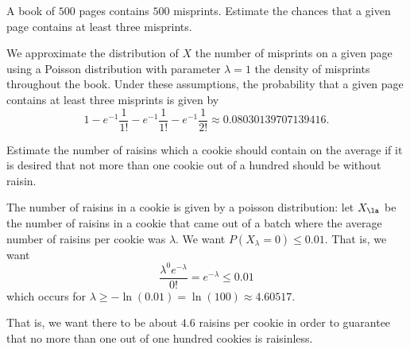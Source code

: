 \begin{problem}[Handout 10, \# 8]
  A book of \(500\) pages contains \(500\) misprints. Estimate the chances
  that a given page contains at least three misprints.
\end{problem}
\begin{solution}
  We approximate the distribution of \(X\) the number of misprints on a
  given page using a Poisson distribution with parameter \(\lambda=1\) the
  density of misprints throughout the book. Under these assumptions, the
  probability that a given page contains at least three misprints is given
  by
  \[
    1-e^{-1}\frac{1}{1!}-e^{-1}\frac{1}{1!}-e^{-1}\frac{1}{2!}
    \approx\num{0.08030139707139416}.
  \]
\end{solution}
\newpage

\begin{problem}[Handout 10, \# 9]
  Estimate the number of raisins which a cookie should contain on the
  average if it is desired that not more than one cookie out of a hundred
  should be without raisin.
\end{problem}
\begin{solution}
  The number of raisins in a cookie is given by a poisson distribution: let
  $X_{\la}$ be the number of raisins in a cookie that came out of a batch
  where the average number of raisins per cookie was $\lambda$. We want
  $P(X_{\lambda} = 0) \leq 0.01$. That is, we want
  \[
    \frac{\lambda^0 e^{-\lambda}}{0!} = e^{-\lambda} \leq 0.01
  \]
  which occurs for $\lambda \geq -\ln(0.01) = \ln(100) \approx 4.60517$.

  That is, we want there to be about $4.6$ raisins per cookie in order to
  guarantee that no more than one out of one hundred cookies is raisinless.
\end{solution}
\newpage

